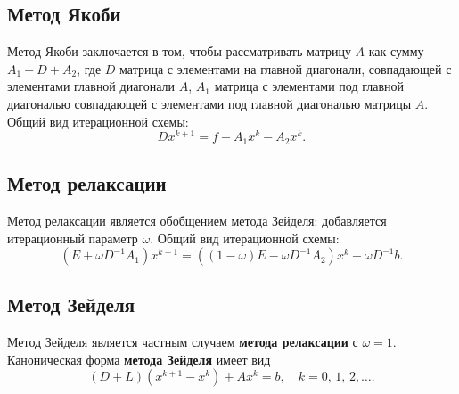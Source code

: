 \documentclass[12pt, a4paper]{article}
\begin{document}
	\subsection{Метод Якоби}
	
	Метод Якоби заключается в том, чтобы рассматривать матрицу $A$ как сумму $A_1 + D + A_2$, где $D$ матрица с элементами на главной диагонали, совпадающей с элементами главной диагонали $A$, $A_1$ матрица с элементами под главной диагональю совпадающей с элементами под главной диагональю матрицы $A$. Общий вид итерационной схемы:
	\[
	D x^{k+1} = f - A_1 x^k - A_2 x^k. 
	\]
			
	\subsection{Метод релаксации}	

	Метод релаксации является обобщением метода Зейделя: добавляется итерационный параметр $\omega$.
	Общий вид итерационной схемы:
	\[
	(E + \omega D^{-1} A_1) x^{k+1} = ((1-\omega)E - \omega D^{-1}A_2) x^{k} + \omega D^{-1}b.
	\]
	


	\subsection{Метод Зейделя}
Метод Зейделя является частным случаем \textbf{метода релаксации} с $\omega = 1$. Каноническая форма \textbf{метода Зейделя} имеет вид
$$
\left( D + L \right ) \left( x^{k+1} - x^k \right ) + Ax^k = b, \quad k = 0, \, 1, \, 2, \dots.
$$

	
\end{document}
